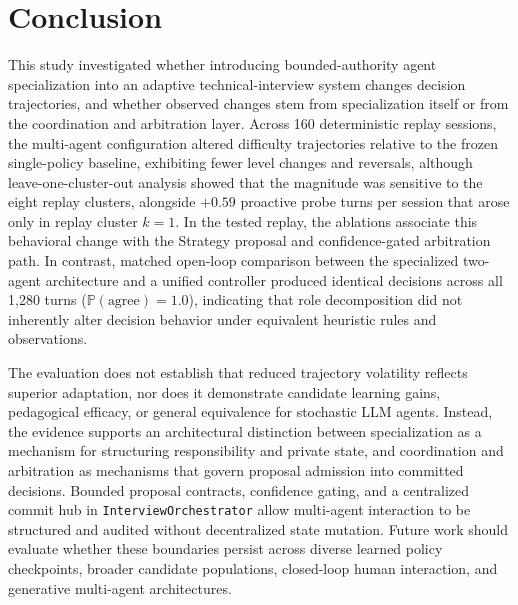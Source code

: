 \section{Conclusion}\label{sec:concl}
This study investigated whether introducing bounded-authority agent specialization into an adaptive technical-interview system changes decision trajectories, and whether observed changes stem from specialization itself or from the coordination and arbitration layer. Across 160 deterministic replay sessions, the multi-agent configuration altered difficulty trajectories relative to the frozen single-policy baseline, exhibiting fewer level changes and reversals, although leave-one-cluster-out analysis showed that the magnitude was sensitive to the eight replay clusters, alongside $+0.59$ proactive probe turns per session that arose only in replay cluster $k=1$. In the tested replay, the ablations associate this behavioral change with the Strategy proposal and confidence-gated arbitration path. In contrast, matched open-loop comparison between the specialized two-agent architecture and a unified controller produced identical decisions across all 1,280 turns ($\mathbb{P}(\text{agree}) = 1.0$), indicating that role decomposition did not inherently alter decision behavior under equivalent heuristic rules and observations.

The evaluation does not establish that reduced trajectory volatility reflects superior adaptation, nor does it demonstrate candidate learning gains, pedagogical efficacy, or general equivalence for stochastic LLM agents. Instead, the evidence supports an architectural distinction between specialization as a mechanism for structuring responsibility and private state, and coordination and arbitration as mechanisms that govern proposal admission into committed decisions. Bounded proposal contracts, confidence gating, and a centralized commit hub in \texttt{InterviewOrchestrator} allow multi-agent interaction to be structured and audited without decentralized state mutation. Future work should evaluate whether these boundaries persist across diverse learned policy checkpoints, broader candidate populations, closed-loop human interaction, and generative multi-agent architectures.
